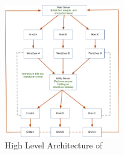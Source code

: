 \begin{figure}[t!]
    \centering
    \includegraphics[width=0.45\textwidth]{fig/arch.pdf}
    \caption{High Level Architecture of \Sys}
    \vspace{-3ex}
    \label{arch}
  \end{figure}

